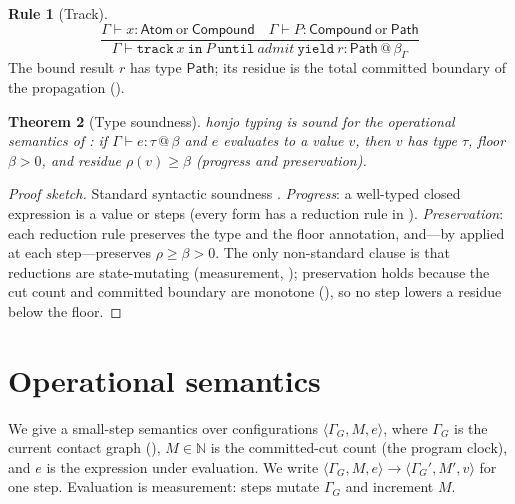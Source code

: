 \documentclass[11pt,a4paper]{article}
\theoremstyle{thmstyle}
\newtheorem{theorem}{Theorem}[section]
\theoremstyle{definition}
\newtheorem{rulename}[theorem]{Rule}
\theoremstyle{remark}
\newcommand{\N}{\mathbb{N}}
\newcommand{\flo}{\beta}
\newcommand{\res}{\rho}
\newcommand{\hj}[1]{\texttt{#1}}
\begin{document}
\begin{rulename}[Track]
\label{rule:track}
\[
\frac{\Gamma\vdash x:\mathsf{Atom}\ \text{or}\ \mathsf{Compound}\quad
      \Gamma\vdash P:\mathsf{Compound}\ \text{or}\ \mathsf{Path}}
     {\Gamma\vdash \hj{track}\ x\ \hj{in}\ P\ \hj{until}\ \textit{admit}\ \hj{yield}\ r
      : \mathsf{Path}\,@\,\flo_\Gamma}
\]
The bound result $r$ has type $\mathsf{Path}$; its residue is the total
committed boundary of the propagation ().
\end{rulename}

\begin{theorem}[Type soundness]
\label{thm:soundness}
honjo typing is sound for the operational semantics of
: if $\Gamma\vdash e:\tau\,@\,\flo$ and $e$ evaluates to a
value $v$, then $v$ has type $\tau$, floor $\flo>0$, and residue
$\res(v)\ge\flo$ (progress and preservation).
\end{theorem}

\begin{proof}[Proof sketch]
Standard syntactic soundness \citep{pierce2002}. \emph{Progress}: a
well-typed closed expression is a value or steps (every form has a
reduction rule in ). \emph{Preservation}: each reduction
rule preserves the type and the floor annotation, and---by
 applied at each step---preserves $\res\ge\flo>0$.
The only non-standard clause is that reductions are state-mutating
(measurement, ); preservation holds because the cut
count and committed boundary are monotone (), so no
step lowers a residue below the floor.
\end{proof}

\section{Operational semantics}
\label{sec:opsem}

We give a small-step semantics over configurations
$\langle \Gamma_G, M, e\rangle$, where $\Gamma_G$ is the current contact
graph (), $M\in\N$ is the committed-cut count
(the program clock), and $e$ is the expression under evaluation. We write
$\langle\Gamma_G,M,e\rangle \to \langle\Gamma_G',M',v\rangle$ for one
step. Evaluation is measurement: steps mutate $\Gamma_G$ and increment
$M$.
\end{document}
